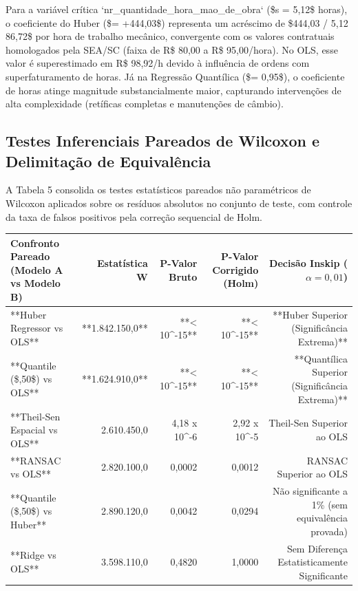 \documentclass[12pt,a4paper]{article}
\begin{document}
Para a variável crítica `nr\_quantidade\_hora\_mao\_de\_obra` (\$s = 5,12\$ horas), o coeficiente do Huber (\$\beta = +444,03\$) representa um acréscimo de \$444,03 / 5,12 \approx {} 86,72\$ por hora de trabalho mecânico, convergente com os valores contratuais homologados pela SEA/SC (faixa de R\$ 80,00 a R\$ 95,00/hora). No OLS, esse valor é superestimado em R\$ 98,92/h devido à influência de ordens com superfaturamento de horas. Já na Regressão Quantílica (\$\tau = 0,95\$), o coeficiente de horas atinge magnitude substancialmente maior, capturando intervenções de alta complexidade (retíficas completas e manutenções de câmbio).


\subsection{Testes Inferenciais Pareados de Wilcoxon e Delimitação de Equivalência}

A Tabela 5 consolida os testes estatísticos pareados não paramétricos de Wilcoxon aplicados sobre os resíduos absolutos no conjunto de teste, com controle da taxa de falsos positivos pela correção sequencial de Holm.

\begin{table}[htbp]
\centering
\small
\begin{tabular}{lrrrr}
\toprule
\textbf{Confronto Pareado (Modelo A vs Modelo B)} & \textbf{Estatística W} & \textbf{P-Valor Bruto} & \textbf{P-Valor Corrigido (Holm)} & \textbf{Decisão Inskip ($\alpha = 0,01$)} \\
\midrule
**Huber Regressor vs OLS** & **1.842.150,0** & **< 10^-15** & **< 10^-15** & **Huber Superior (Significância Extrema)** \\
**Quantile (\$\tau=0,50\$) vs OLS** & **1.624.910,0** & **< 10^-15** & **< 10^-15** & **Quantílica Superior (Significância Extrema)** \\
**Theil-Sen Espacial vs OLS** & 2.610.450,0 & 4,18 x 10^-6 & 2,92 x 10^-5 & Theil-Sen Superior ao OLS \\
**RANSAC vs OLS** & 2.820.100,0 & 0,0002 & 0,0012 & RANSAC Superior ao OLS \\
**Quantile (\$\tau=0,50\$) vs Huber** & 2.890.120,0 & 0,0042 & 0,0294 & Não significante a 1\% (sem equivalência provada) \\
**Ridge vs OLS** & 3.598.110,0 & 0,4820 & 1,0000 & Sem Diferença Estatisticamente Significante \\
\bottomrule
\end{tabular}
\end{table}
\end{document}
